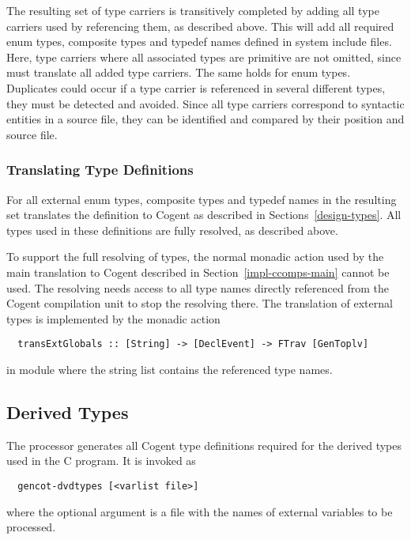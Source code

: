 The resulting set of type carriers is transitively completed by adding all type carriers used by referencing them,
as described above. This will add all required enum types, composite types and typedef names defined in system include files.
Here, type carriers where all associated types are primitive are not omitted, since 
 must translate all added type carriers. The same holds for enum types. 
Duplicates could occur if a type carrier is referenced
in several different types, they must be detected and avoided. Since all type carriers correspond to 
syntactic entities in a source file, they can be identified and compared by their position and source file.

\subsubsection{Translating Type Definitions}

For all external enum types, composite types and typedef names in the resulting set  translates the
definition to Cogent as described in Sections~\ref{design-types}.
All types used in these definitions are fully resolved, as described above.

To support the full resolving of types, the normal monadic action  used by the main translation 
to Cogent described in Section~\ref{impl-ccomps-main} cannot be used. The resolving needs access to all
type names directly referenced from the Cogent compilation unit to stop the resolving there.
The translation of external types is implemented by the monadic action 
\begin{verbatim}
  transExtGlobals :: [String] -> [DeclEvent] -> FTrav [GenToplv]
\end{verbatim}
in module  where the string list contains the referenced type names.

\subsection{Derived Types}
\label{impl-ccomps-dvdtypes}

The processor  generates all Cogent type definitions required for the derived types
used in the C program. It is invoked as
\begin{verbatim}
  gencot-dvdtypes [<varlist file>]
\end{verbatim}
where the optional argument is a file with the names of external variables to be processed.

